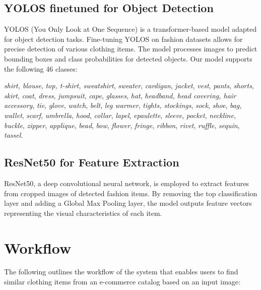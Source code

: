 \subsection*{YOLOS finetuned for Object Detection}
YOLOS (You Only Look at One Sequence) is a transformer-based model adapted for object detection tasks. Fine-tuning YOLOS on fashion datasets allows for precise detection of various clothing items. The model processes images to predict bounding boxes and class probabilities for detected objects. Our model supports the following 46 classes:
\begin{center}
\begin{minipage}{0.6\textwidth}
    \textit{shirt, blouse}, \textit{top, t-shirt, sweatshirt}, \textit{sweater}, \textit{cardigan}, \textit{jacket}, \textit{vest}, \textit{pants}, \textit{shorts}, \textit{skirt}, \textit{coat}, \textit{dress}, \textit{jumpsuit}, \textit{cape}, \textit{glasses}, \textit{hat}, \textit{headband, head covering, hair accessory}, \textit{tie}, \textit{glove}, \textit{watch}, \textit{belt}, \textit{leg warmer}, \textit{tights, stockings}, \textit{sock}, \textit{shoe}, \textit{bag, wallet}, \textit{scarf}, \textit{umbrella}, \textit{hood}, \textit{collar}, \textit{lapel}, \textit{epaulette}, \textit{sleeve}, \textit{pocket}, \textit{neckline}, \textit{buckle}, \textit{zipper}, \textit{applique}, \textit{bead}, \textit{bow}, \textit{flower}, \textit{fringe}, \textit{ribbon}, \textit{rivet}, \textit{ruffle}, \textit{sequin}, \textit{tassel}.
\end{minipage}
\end{center}

\subsection*{ResNet50 for Feature Extraction}
ResNet50, a deep convolutional neural network, is employed to extract features from cropped images of detected fashion items. By removing the top classification layer and adding a Global Max Pooling layer, the model outputs feature vectors representing the visual characteristics of each item.

\section*{Workflow}

The following outlines the workflow of the system that enables users to find similar clothing items from an e-commerce catalog based on an input image:

